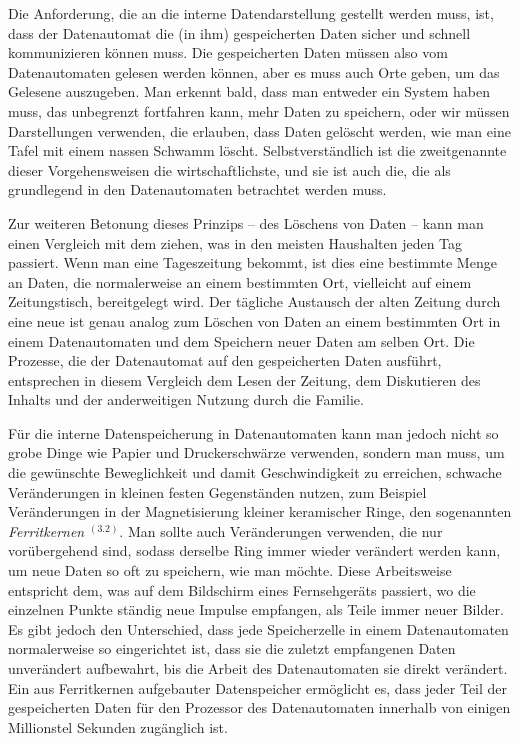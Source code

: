 {Die Anforderung, die an die interne Datendarstellung gestellt werden muss, ist, dass der Datenautomat die (in ihm) gespeicherten Daten sicher und schnell kommunizieren können muss. Die gespeicherten Daten müssen also vom Datenautomaten gelesen werden können, aber es muss auch Orte geben, um das Gelesene auszugeben. Man erkennt bald, dass man entweder ein System haben muss, das unbegrenzt fortfahren kann, mehr Daten zu speichern, oder wir müssen Darstellungen verwenden, die erlauben, dass Daten gelöscht werden, wie man eine Tafel mit einem nassen Schwamm löscht. Selbstverständlich ist die zweitgenannte dieser Vorgehensweisen die wirtschaftlichste, und sie ist auch die, die als grundlegend in den Datenautomaten betrachtet werden muss.

Zur weiteren Betonung dieses Prinzips -- des Löschens von Daten -- kann man einen Vergleich mit dem ziehen, was in den meisten Haushalten jeden Tag passiert. Wenn man eine Tageszeitung bekommt, ist dies eine bestimmte Menge an Daten, die normalerweise an einem bestimmten Ort, vielleicht auf einem Zeitungstisch, bereitgelegt wird. Der tägliche Austausch der alten Zeitung durch eine neue ist genau analog zum Löschen von Daten an einem bestimmten Ort in einem Datenautomaten und dem Speichern neuer Daten am selben Ort. Die Prozesse, die der Datenautomat auf den gespeicherten Daten ausführt, entsprechen in diesem Vergleich dem Lesen der Zeitung, dem Diskutieren des Inhalts und der anderweitigen Nutzung durch die Familie.

Für die interne Datenspeicherung in Datenautomaten kann man jedoch nicht so grobe Dinge wie Papier und Druckerschwärze verwenden, sondern man muss, um die gewünschte Beweglichkeit und damit Geschwindigkeit zu erreichen, schwache Veränderungen in kleinen festen Gegenständen nutzen, zum Beispiel Veränderungen in der Magnetisierung kleiner keramischer Ringe, den sogenannten \emph{Ferritkernen} $^{(3.2)}$. Man sollte auch Veränderungen verwenden, die nur vorübergehend sind, sodass derselbe Ring immer wieder verändert werden kann, um neue Daten so oft zu speichern, wie man möchte. Diese Arbeitsweise entspricht dem, was auf dem Bildschirm eines Fernsehgeräts passiert, wo die einzelnen Punkte ständig neue Impulse empfangen, als Teile immer neuer Bilder. Es gibt jedoch den Unterschied, dass jede Speicherzelle in einem Datenautomaten normalerweise so eingerichtet ist, dass sie die zuletzt empfangenen Daten unverändert aufbewahrt, bis die Arbeit des Datenautomaten sie direkt verändert. Ein aus Ferritkernen aufgebauter Datenspeicher ermöglicht es, dass jeder Teil der gespeicherten Daten für den Prozessor des Datenautomaten innerhalb von einigen Millionstel Sekunden zugänglich ist.

}
